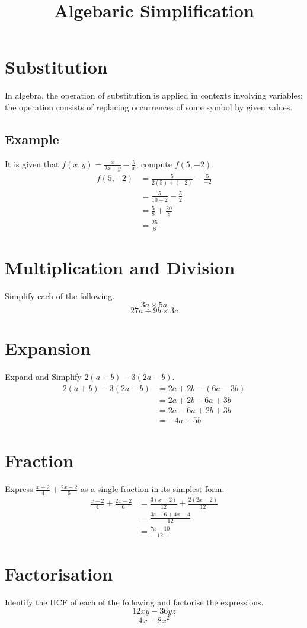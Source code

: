 \documentclass[a4paper,12pt]{article}
\title{Algebaric Simplification}
\date{}
\author{}
\begin{document}
\maketitle

\section{Substitution}
In algebra, 
the operation of substitution is applied in contexts involving variables;
the operation consists of replacing occurrences of some symbol by given values.
\subsection{Example}
It is given that \(f(x,y)=\displaystyle\frac x{2x+y}-\frac yx\), compute \(f(5,-2)\).
\[\begin{aligned}
    f(5,-2)&=\frac5{2(5)+(-2)}-\frac5{-2}\\
           &=\frac5{10-2}-\frac52\\
           &=\frac58+\frac{20}8\\
           &=\boxed{\frac{25}8}
\end{aligned}\]

\newpage

\section{Multiplication and Division}
Simplify each of the following.
\[3a\times5a\]
\[27a\div9b\times3c\]

\section{Expansion}
Expand and Simplify \(2(a+b)-3(2a-b)\).
\[\begin{aligned}
    2(a+b)-3(2a-b)&=2a+2b-(6a-3b)\\
                  &=2a+2b-6a+3b\\
                  &=2a-6a+2b+3b\\
                  &=\boxed{-4a+5b}
\end{aligned}\]

\section{Fraction}
Express \(\displaystyle\frac{x-2}4+\frac{2x-2}6\) as a single fraction in its simplest form.
\[\begin{aligned}
    \frac{x-2}4+\frac{2x-2}6&=\frac{3(x-2)}{12}+\frac{2(2x-2)}{12}\\
                            &=\frac{3x-6+4x-4}{12}\\
                            &=\boxed{\frac{7x-10}{12}}
\end{aligned}\]

\section{Factorisation}
Identify the HCF of each of the following and factorise the expressions.
\[12xy-36yz\]
\[4x-8x^2\]
\end{document}
